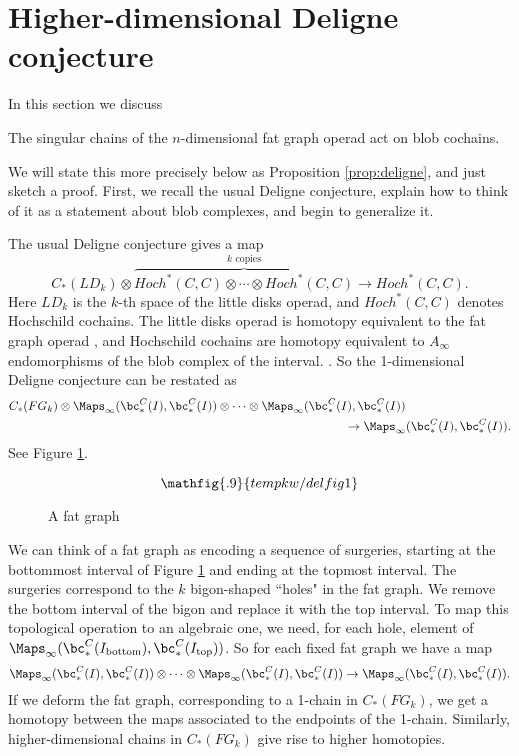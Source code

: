 
\section{Higher-dimensional Deligne conjecture}
\label{sec:deligne}
In this section we discuss
\newenvironment{property:deligne}{\textbf{Property \ref{property:deligne} (Higher dimensional Deligne conjecture)}\it}{}

\begin{property:deligne}
The singular chains of the $n$-dimensional fat graph operad act on blob cochains.
\end{property:deligne}

We will state this more precisely below as Proposition \ref{prop:deligne}, and just sketch a proof. First, we recall the usual Deligne conjecture, explain how to think of it as a statement about blob complexes, and begin to generalize it.

\def\mapinf{\Maps_\infty}

The usual Deligne conjecture  gives a map
\[
	C_*(LD_k)\otimes \overbrace{Hoch^*(C, C)\otimes\cdots\otimes Hoch^*(C, C)}^{\text{$k$ copies}}
			\to  Hoch^*(C, C) .
\]
Here $LD_k$ is the $k$-th space of the little disks operad, and $Hoch^*(C, C)$ denotes Hochschild
cochains.
The little disks operad is homotopy equivalent to the fat graph operad
, and Hochschild cochains are homotopy equivalent to $A_\infty$ endomorphisms
of the blob complex of the interval.
.
So the 1-dimensional Deligne conjecture can be restated as
\begin{eqnarray*}
	C_*(FG_k)\otimes \mapinf(\bc^C_*(I), \bc^C_*(I))\otimes\cdots
	\otimes \mapinf(\bc^C_*(I), \bc^C_*(I)) & \\
	  & \hspace{-5em} \to  \mapinf(\bc^C_*(I), \bc^C_*(I)) .
\end{eqnarray*}
See Figure \ref{delfig1}.
\begin{figure}[!ht]
$$\mathfig{.9}{tempkw/delfig1}$$
\caption{A fat graph}\label{delfig1}\end{figure}

We can think of a fat graph as encoding a sequence of surgeries, starting at the bottommost interval
of Figure \ref{delfig1} and ending at the topmost interval.
The surgeries correspond to the $k$ bigon-shaped ``holes" in the fat graph.
We remove the bottom interval of the bigon and replace it with the top interval.
To map this topological operation to an algebraic one, we need, for each hole, element of
$\mapinf(\bc^C_*(I_{\text{bottom}}), \bc^C_*(I_{\text{top}}))$.
So for each fixed fat graph we have a map
\[
	 \mapinf(\bc^C_*(I), \bc^C_*(I))\otimes\cdots
	\otimes \mapinf(\bc^C_*(I), \bc^C_*(I))  \to  \mapinf(\bc^C_*(I), \bc^C_*(I)) .
\]
If we deform the fat graph, corresponding to a 1-chain in $C_*(FG_k)$, we get a homotopy
between the maps associated to the endpoints of the 1-chain.
Similarly, higher-dimensional chains in $C_*(FG_k)$ give rise to higher homotopies.

